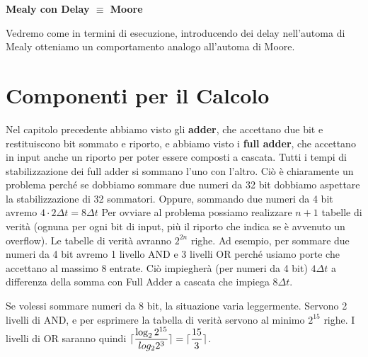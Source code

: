 \begin{exmp}
\textbf{Mealy con Delay $ \equiv $ Moore}

Vedremo come in termini di esecuzione, introducendo dei delay nell'automa di
Mealy otteniamo un comportamento analogo all'automa di Moore.

\end{exmp}

\FloatBarrier

\section{Componenti per il Calcolo}

Nel capitolo precedente abbiamo visto gli \textbf{adder}, che accettano due bit
e restituiscono bit sommato e riporto, e abbiamo visto i \textbf{full adder},
che accettano in input anche un riporto per poter essere composti a cascata.
Tutti i tempi di stabilizzazione dei full adder si sommano l'uno con l'altro.
Ciò è chiaramente un problema perché se dobbiamo sommare due numeri da 32 bit
dobbiamo aspettare la stabilizzazione di 32 sommatori. Oppure, sommando due
numeri da 4 bit avremo $ 4 \cdot 2 \Delta t = 8 \Delta t $
Per ovviare al problema possiamo realizzare $ n + 1 $ tabelle di verità (ognuna
per ogni bit di input, più il riporto che indica se è avvenuto un overflow). Le
tabelle di verità avranno $ 2^{2n} $ righe. Ad esempio, per sommare due numeri
da 4 bit avremo 1 livello AND e 3 livelli OR perché usiamo porte che accettano
al massimo 8 entrate. Ciò impiegherà (per numeri da 4 bit) $ 4 \Delta t $ a
differenza della somma con Full Adder a cascata che impiega $ 8 \Delta t $.

Se volessi sommare numeri da 8 bit, la situazione varia leggermente. Servono 2
livelli di AND, e per esprimere la tabella di verità servono al minimo $ 2^{15}
$ righe. I livelli di OR saranno quindi $ \lceil\dfrac{\log_2 2^{15}}{log_2
2^3}\rceil =  \lceil\dfrac{15}{3}\rceil $.

